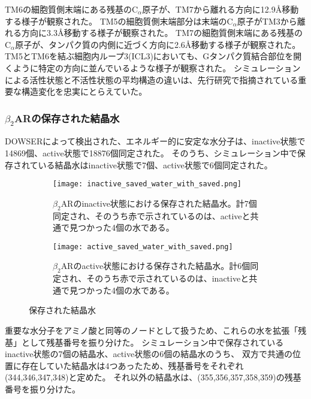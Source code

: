 \newpage

TM6の細胞質側末端にある残基の$\mathrm{C}_\alpha$原子が、TM7から離れる方向に12.9Å移動する様子が観察された。
TM5の細胞質側末端部分は末端の$\mathrm{C}_\alpha$原子がTM3から離れる方向に3.3Å移動する様子が観察された。
TM7の細胞質側末端にある残基の$\mathrm{C}_\alpha$原子が、タンパク質の内側に近づく方向に2.6Å移動する様子が観察された。
TM5とTM6を結ぶ細胞内ループ3(ICL3)においても、Gタンパク質結合部位を開くように特定の方向に並んでいるような様子が観察された。
シミュレーションによる活性状態と不活性状態の平均構造の違いは、先行研究で指摘されている重要な構造変化を忠実にとらえていた。

\subsubsection{$\beta_2$ARの保存された結晶水}
DOWSERによって検出された、エネルギー的に安定な水分子は、inactive状態で14869個、active状態で18876個同定された。
そのうち、シミュレーション中で保存されている結晶水はinactive状態で7個、active状態で6個同定された。

\begin{figure}[htbp]
    \centering
    \begin{subfigure}{0.48\textwidth} %
      \centering
      \texttt{[image: inactive\_saved\_water\_with\_saved.png]}
      \caption{$\beta_2$ARのinactive状態における保存された結晶水。計7個同定され、そのうち赤で示されているのは、activeと共通で見つかった4個の水である。}
      \label{fig:inactive_water}
    \end{subfigure}
    \hspace{0.02\textwidth} %
    \begin{subfigure}{0.48\textwidth}
      \centering
      \texttt{[image: active\_saved\_water\_with\_saved.png]}
      \caption{$\beta_2$ARのactive状態における保存された結晶水。計6個同定され、そのうち赤で示されているのは、inactiveと共通で見つかった4個の水である。}
      \label{fig:active_water}
    \end{subfigure}
    \caption{保存された結晶水}
    \label{fig:water-all}
  \end{figure}

\newpage

重要な水分子をアミノ酸と同等のノードとして扱うため、これらの水を拡張「残基」として残基番号を振り分けた。
シミュレーション中で保存されているinactive状態の7個の結晶水、active状態の6個の結晶水のうち、
双方で共通の位置に存在していた結晶水は4つあったため、残基番号をそれぞれ(344,346,347,348)と定めた。
それ以外の結晶水は、(355,356,357,358,359)の残基番号を振り分けた。

